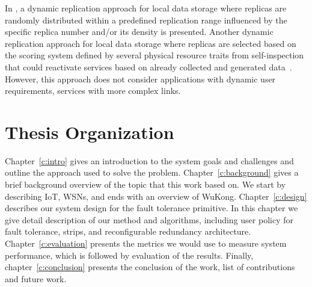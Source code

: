 In \cite{Piotrowski2009}, a dynamic replication approach for local data storage
where replicas are randomly distributed within a predefined replication range
influenced by the specific replica number and/or its density is presented. 
Another dynamic replication approach for local data storage where replicas are
selected based on the scoring system defined by several physical resource traits
from self-inspection that could reactivate services based on already collected
and generated data~\cite{Neumann2010}. However, this approach does not consider
applications with dynamic user requirements, services with more complex links.

\section{Thesis Organization}

Chapter~\ref{c:intro} gives an introduction to the system goals and challenges
and outline the approach used to solve the problem. Chapter~\ref{c:background}
gives a brief background overview of the topic that this work based on.  We
start by describing IoT, WSNs, and ends with an overview of WuKong.
Chapter~\ref{c:design} describes our system design for the fault
tolerance primitive. In this chapter we give detail description of our method and
algorithms, including user policy for fault tolerance, strips, and
reconfigurable redundancy architecture.  Chapter~\ref{c:evaluation} presents the
metrics we would use to measure system performance, which is followed by
evaluation of the results. Finally, chapter~\ref{c:conclusion} presents the
conclusion of the work, list of contributions and future work.
